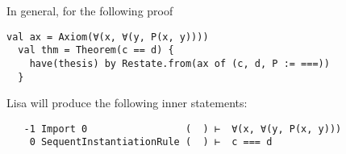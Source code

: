 In general, for the following proof
\begin{lstlisting}[language=lisa, frame=single]
  val ax = Axiom(∀(x, ∀(y, P(x, y))))
  val thm = Theorem(c == d) {
    have(thesis) by Restate.from(ax of (c, d, P := ===))
  }
\end{lstlisting}
Lisa will produce the following inner statements:
\begin{lstlisting}
   -1 Import 0                 (  ) ⊢  ∀(x, ∀(y, P(x, y)))
    0 SequentInstantiationRule (  ) ⊢  c === d
\end{lstlisting}
